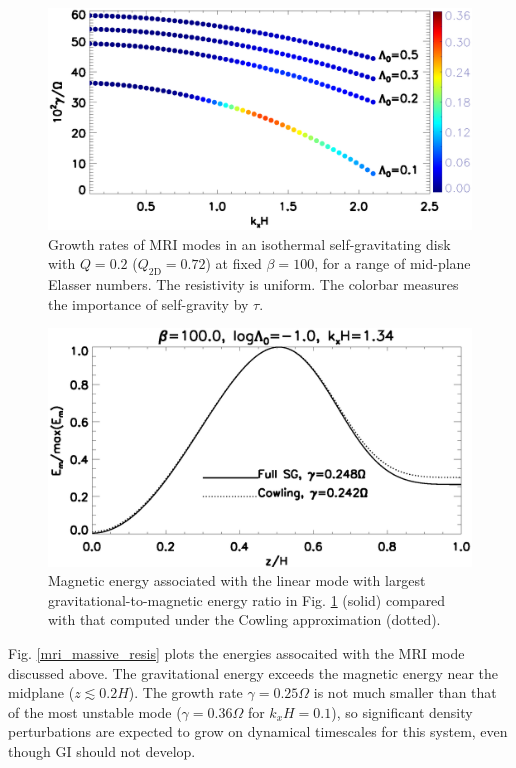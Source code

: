 \begin{figure}
  \includegraphics[width=\linewidth]{figures/compare_energy_resis}
  \caption{
    Growth rates of MRI modes in an isothermal self-gravitating
    disk with $Q=0.2$ ($Q_\mathrm{2D}=0.72$) at fixed $\beta=100$, 
    for a range of mid-plane Elasser numbers. The resistivity is
    uniform. The colorbar measures the importance of self-gravity by $\tau$. 
    \label{gravity_energy_resis}}
\end{figure}


\begin{figure}
  \includegraphics[width=\linewidth]{figures/compare_result_cowling}
  \caption{Magnetic energy associated with the linear mode with
    largest gravitational-to-magnetic energy ratio in
    Fig. \ref{gravity_energy_resis} (solid) compared with that computed
    under the Cowling approximation (dotted). %
    \label{mri_massive_cowling}}
\end{figure}

Fig. \ref{mri_massive_resis} plots the energies assocaited with the 
MRI mode discussed above. 
The gravitational energy exceeds the 
magnetic energy near the midplane ($z\lesssim0.2H$). The growth rate $\gamma=0.25\Omega$
is not much smaller than that of the most unstable mode
($\gamma=0.36\Omega$ for $k_xH=0.1$), so significant density
perturbations are expected to grow on dynamical timescales for this
system, even though GI should not develop. 

